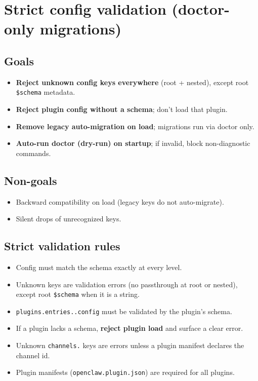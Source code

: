 \section{Strict config validation (doctor-only migrations)}


\subsection{Goals}


\begin{itemize}
  \item \textbf{Reject unknown config keys everywhere} (root + nested), except root \texttt{\$schema} metadata.
  \item \textbf{Reject plugin config without a schema}; don’t load that plugin.
  \item \textbf{Remove legacy auto-migration on load}; migrations run via doctor only.
  \item \textbf{Auto-run doctor (dry-run) on startup}; if invalid, block non-diagnostic commands.
\end{itemize}


\subsection{Non-goals}


\begin{itemize}
  \item Backward compatibility on load (legacy keys do not auto-migrate).
  \item Silent drops of unrecognized keys.
\end{itemize}


\subsection{Strict validation rules}


\begin{itemize}
  \item Config must match the schema exactly at every level.
  \item Unknown keys are validation errors (no passthrough at root or nested), except root \texttt{\$schema} when it is a string.
  \item \texttt{plugins.entries..config} must be validated by the plugin’s schema.
  \item If a plugin lacks a schema, \textbf{reject plugin load} and surface a clear error.
  \item Unknown \texttt{channels.} keys are errors unless a plugin manifest declares the channel id.
  \item Plugin manifests (\texttt{openclaw.plugin.json}) are required for all plugins.
\end{itemize}


